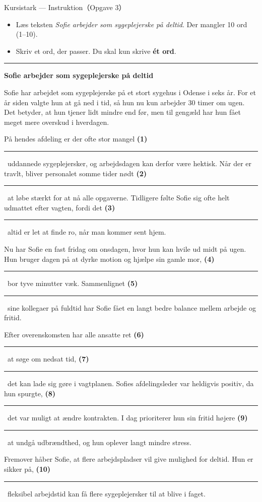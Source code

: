 \begin{emailbox}{Kursistark --- Instruktion（Opgave 3）}
\begin{itemize}
  \item Læs teksten \textit{Sofie arbejder som sygeplejerske på deltid}. Der mangler 10 ord (1--10).
  \item Skriv et ord, der passer. Du skal kun skrive \textbf{ét ord}.
\end{itemize}

\vspace{0.35em}
\hrule
\vspace{0.45em}

\textbf{\color{NCDNavy}Sofie arbejder som sygeplejerske på deltid}

\vspace{0.3em}
Sofie har arbejdet som sygeplejerske på et stort sygehus i Odense i seks år. For et år siden valgte hun at gå ned i tid, så hun nu kun arbejder 30 timer om ugen. Det betyder, at hun tjener lidt mindre end før, men til gengæld har hun fået meget mere overskud i hverdagen.

\vspace{0.25em}
På hendes afdeling er der ofte stor mangel \textbf{(1)}\ \rule{1.8cm}{0.4pt}\ uddannede sygeplejersker, og arbejdsdagen kan derfor være hektisk. Når der er travlt, bliver personalet somme tider nødt \textbf{(2)}\ \rule{1.8cm}{0.4pt}\ at løbe stærkt for at nå alle opgaverne. Tidligere følte Sofie sig ofte helt udmattet efter vagten, fordi det \textbf{(3)}\ \rule{1.8cm}{0.4pt}\ altid er let at finde ro, når man kommer sent hjem.

\vspace{0.25em}
Nu har Sofie en fast fridag om onsdagen, hvor hun kan hvile ud midt på ugen. Hun bruger dagen på at dyrke motion og hjælpe sin gamle mor, \textbf{(4)}\ \rule{1.8cm}{0.4pt}\ bor tyve minutter væk. Sammenlignet \textbf{(5)}\ \rule{1.8cm}{0.4pt}\ sine kollegaer på fuldtid har Sofie fået en langt bedre balance mellem arbejde og fritid.

\vspace{0.25em}
Efter overenskomsten har alle ansatte ret \textbf{(6)}\ \rule{1.8cm}{0.4pt}\ at søge om nedsat tid, \textbf{(7)}\ \rule{1.8cm}{0.4pt}\ det kan lade sig gøre i vagtplanen. Sofies afdelingsleder var heldigvis positiv, da hun spurgte, \textbf{(8)}\ \rule{1.8cm}{0.4pt}\ det var muligt at ændre kontrakten. I dag prioriterer hun sin fritid højere \textbf{(9)}\ \rule{1.8cm}{0.4pt}\ at undgå udbrændthed, og hun oplever langt mindre stress.

\vspace{0.25em}
Fremover håber Sofie, at flere arbejdspladser vil give mulighed for deltid. Hun er sikker på, \textbf{(10)}\ \rule{1.8cm}{0.4pt}\ fleksibel arbejdstid kan få flere sygeplejersker til at blive i faget.
\end{emailbox}

